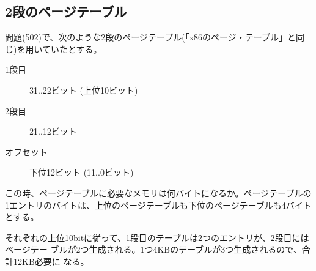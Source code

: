 \documentclass[a4j,9pt]{jsarticle}
\begin{document}
\subsection{2段のページテーブル}
\begin{screen}
 問題(502)で、次のような2段のページテーブル(「x86のページ・テーブル」と同じ)を用いていたとする。
\begin{description}
 \item[1段目] 31..22ビット (上位10ビット)
 \item[2段目] 21..12ビット
 \item[オフセット] 下位12ビット (11..0ビット)
\end{description}

この時、ページテーブルに必要なメモリは何バイトになるか。ページテーブルの1エントリのバイトは、上位のページテーブルも下位のページテーブルも4バイトとする。
\end{screen}
それぞれの上位10bitに従って、1段目のテーブルは2つのエントリが、2段目にはページテー
ブルが2つ生成される。1つ4KBのテーブルが3つ生成されるので、合計12KB必要に
なる。
\end{document}

